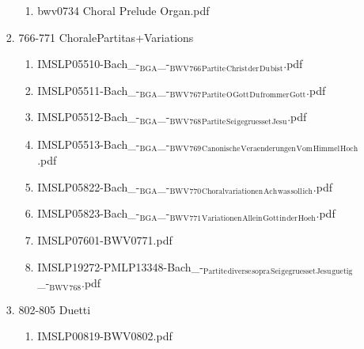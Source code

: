 \documentclass[11pt]{article}
\begin{document}
\begin{enumerate}
\begin{enumerate}
\begin{enumerate}
\begin{enumerate}
\item bwv0734   Choral Prelude Organ.pdf
\label{sec-1-1-1-1-44-6-4-1-17-20}
\end{enumerate}

\item 766-771 ChoralePartitas+Variations
\label{sec-1-1-1-1-44-6-4-1-18}
\begin{enumerate}
\item IMSLP05510-Bach\_-$_{\text{BGA}}$\_-$_{\text{BWV}}$$_{\text{766}}$$_{\text{Partite}}$$_{\text{Christ}}$$_{\text{der}}$$_{\text{Du}}$$_{\text{bist}}$.pdf
\label{sec-1-1-1-1-44-6-4-1-18-1}

\item IMSLP05511-Bach\_-$_{\text{BGA}}$\_-$_{\text{BWV}}$$_{\text{767}}$$_{\text{Partite}}$$_{\text{O}}$$_{\text{Gott}}$$_{\text{Du}}$$_{\text{frommer}}$$_{\text{Gott}}$.pdf
\label{sec-1-1-1-1-44-6-4-1-18-2}

\item IMSLP05512-Bach\_-$_{\text{BGA}}$\_-$_{\text{BWV}}$$_{\text{768}}$$_{\text{Partite}}$$_{\text{Sei}}$$_{\text{gegruesset}}$$_{\text{Jesu}}$.pdf
\label{sec-1-1-1-1-44-6-4-1-18-3}

\item IMSLP05513-Bach\_-$_{\text{BGA}}$\_-$_{\text{BWV}}$$_{\text{769}}$$_{\text{Canonische}}$$_{\text{Veraenderungen}}$$_{\text{Vom}}$$_{\text{Himmel}}$$_{\text{Hoch}}$.pdf
\label{sec-1-1-1-1-44-6-4-1-18-4}

\item IMSLP05822-Bach\_-$_{\text{BGA}}$\_-$_{\text{BWV}}$$_{\text{770}}$$_{\text{Choralvariationen}}$$_{\text{Ach}}$$_{\text{was}}$$_{\text{soll}}$$_{\text{ich}}$.pdf
\label{sec-1-1-1-1-44-6-4-1-18-5}

\item IMSLP05823-Bach\_-$_{\text{BGA}}$\_-$_{\text{BWV}}$$_{\text{771}}$$_{\text{Variationen}}$$_{\text{Allein}}$$_{\text{Gott}}$$_{\text{in}}$$_{\text{der}}$$_{\text{Hoeh}}$.pdf
\label{sec-1-1-1-1-44-6-4-1-18-6}

\item IMSLP07601-BWV0771.pdf
\label{sec-1-1-1-1-44-6-4-1-18-7}

\item IMSLP19272-PMLP13348-Bach\_-$_{\text{Partite}}$$_{\text{diverse}}$$_{\text{sopra}}$$_{\text{Sei}}$$_{\text{gegruesset}}$$_{\text{Jesu}}$$_{\text{guetig}}$\_-$_{\text{BWV}}$$_{\text{768}}$.pdf
\label{sec-1-1-1-1-44-6-4-1-18-8}
\end{enumerate}

\item 802-805 Duetti
\label{sec-1-1-1-1-44-6-4-1-19}
\begin{enumerate}
\item IMSLP00819-BWV0802.pdf
\label{sec-1-1-1-1-44-6-4-1-19-1}


\end{enumerate}
\end{enumerate}
\end{enumerate}
\end{enumerate}
\end{document}

